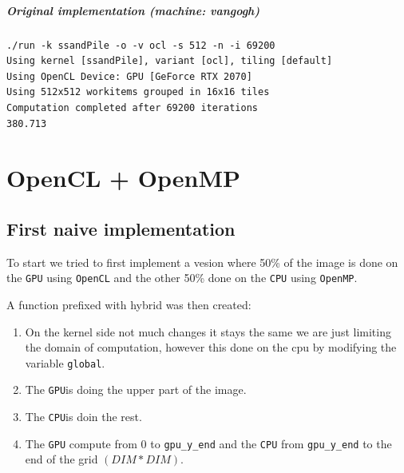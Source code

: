 \documentclass{report}
\def\openCL{\texttt{OpenCL}}
\def\openMP{\texttt{OpenMP}}
\def\CPU{\texttt{CPU}}
\def\GPU{\texttt{GPU}}
\begin{document}
\paragraph{Original implementation (machine: vangogh)}
\begin{verbatim}
./run -k ssandPile -o -v ocl -s 512 -n -i 69200
Using kernel [ssandPile], variant [ocl], tiling [default]
Using OpenCL Device: GPU [GeForce RTX 2070]
Using 512x512 workitems grouped in 16x16 tiles 
Computation completed after 69200 iterations
380.713 
\end{verbatim}

\chapter{OpenCL + OpenMP}

\section{First naive implementation}
To start we tried to first implement a vesion where 50\% of the image is done on the \GPU{}
using \openCL{} and the other 50\% done on the \CPU{} using  \openMP{}.

A function prefixed with hybrid was then created:
\begin{enumerate}
	\item On the kernel side not much changes it stays the same we are just limiting the domain
	      of computation, however this done on the cpu by modifying the variable \texttt{global}.
	\item The \GPU is doing the upper part of the image.
	\item The \CPU is doin the rest.
	\item The \GPU{} compute from 0 to \texttt{gpu\_y\_end} and the \CPU{} from \texttt{gpu\_y\_end}
	      to the end of the grid $(DIM*DIM)$.
\end{enumerate}
\end{document}

